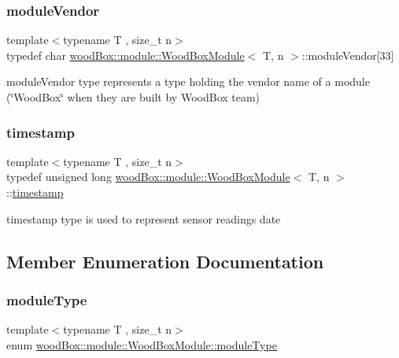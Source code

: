 \subsubsection{\texorpdfstring{module\+Vendor}{moduleVendor}}
{\footnotesize\ttfamily template$<$typename T , size\+\_\+t n$>$ \\
typedef char \mbox{\hyperlink{classwood_box_1_1module_1_1_wood_box_module}{wood\+Box\+::module\+::\+Wood\+Box\+Module}}$<$ T, n $>$\+::module\+Vendor\mbox{[}33\mbox{]}}

{\ttfamily module\+Vendor} type represents a type holding the vendor name of a module (\char`\"{}\+Wood\+Box\char`\"{} when they are built by Wood\+Box team) \mbox{\label{classwood_box_1_1module_1_1_wood_box_module_ab03bf835ec02656605c3c0df0188dc28}} 
\subsubsection{\texorpdfstring{timestamp}{timestamp}}
{\footnotesize\ttfamily template$<$typename T , size\+\_\+t n$>$ \\
typedef unsigned long \mbox{\hyperlink{classwood_box_1_1module_1_1_wood_box_module}{wood\+Box\+::module\+::\+Wood\+Box\+Module}}$<$ T, n $>$\+::\mbox{\hyperlink{classwood_box_1_1module_1_1_wood_box_module_ab03bf835ec02656605c3c0df0188dc28}{timestamp}}}

{\ttfamily timestamp} type is used to represent sensor readings date 

\subsection{Member Enumeration Documentation}
\mbox{\label{classwood_box_1_1module_1_1_wood_box_module_af74476c8a785de7fe587c4fb68435673}} 
\subsubsection{\texorpdfstring{module\+Type}{moduleType}}
{\footnotesize\ttfamily template$<$typename T , size\+\_\+t n$>$ \\
enum \mbox{\hyperlink{classwood_box_1_1module_1_1_wood_box_module_af74476c8a785de7fe587c4fb68435673}{wood\+Box\+::module\+::\+Wood\+Box\+Module\+::module\+Type}}}

